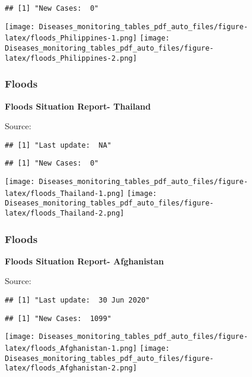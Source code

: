 \documentclass[]{article}
\begin{document}
\begin{verbatim}
## [1] "New Cases:  0"
\end{verbatim}

\texttt{[image: Diseases\_monitoring\_tables\_pdf\_auto\_files/figure-latex/floods\_Philippines-1.png]}
\texttt{[image: Diseases\_monitoring\_tables\_pdf\_auto\_files/figure-latex/floods\_Philippines-2.png]}

\pagebreak

\hypertarget{floods-3}{%
\subsubsection{Floods}\label{floods-3}}

\textbf{Floods Situation Report- Thailand}

Source:

\begin{verbatim}
## [1] "Last update:  NA"
\end{verbatim}

\begin{verbatim}
## [1] "New Cases:  0"
\end{verbatim}

\texttt{[image: Diseases\_monitoring\_tables\_pdf\_auto\_files/figure-latex/floods\_Thailand-1.png]}
\texttt{[image: Diseases\_monitoring\_tables\_pdf\_auto\_files/figure-latex/floods\_Thailand-2.png]}

\pagebreak

\hypertarget{floods-4}{%
\subsubsection{Floods}\label{floods-4}}

\textbf{Floods Situation Report- Afghanistan}

Source:

\begin{verbatim}
## [1] "Last update:  30 Jun 2020"
\end{verbatim}

\begin{verbatim}
## [1] "New Cases:  1099"
\end{verbatim}

\texttt{[image: Diseases\_monitoring\_tables\_pdf\_auto\_files/figure-latex/floods\_Afghanistan-1.png]}
\texttt{[image: Diseases\_monitoring\_tables\_pdf\_auto\_files/figure-latex/floods\_Afghanistan-2.png]}
\end{document}
